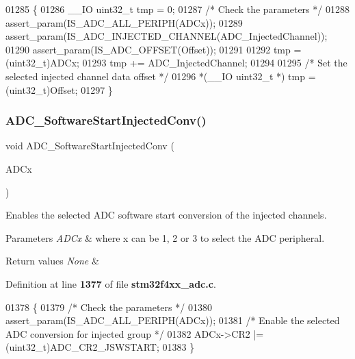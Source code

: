 \begin{DoxyCode}
01285 \{
01286     \_\_IO uint32\_t tmp = 0;
01287   \textcolor{comment}{/* Check the parameters */}
01288   assert_param(IS_ADC_ALL_PERIPH(ADCx));
01289   assert_param(IS_ADC_INJECTED_CHANNEL(ADC\_InjectedChannel));
01290   assert_param(IS_ADC_OFFSET(Offset));
01291   
01292   tmp = (uint32\_t)ADCx;
01293   tmp += ADC\_InjectedChannel;
01294   
01295   \textcolor{comment}{/* Set the selected injected channel data offset */}
01296  *(\_\_IO uint32\_t *) tmp = (uint32\_t)Offset;
01297 \}
\end{DoxyCode}
\mbox{\label{group__ADC__Group6_ga79b2f6c3c77925b35495f2db228895de}} 
\subsubsection{A\+D\+C\+\_\+\+Software\+Start\+Injected\+Conv()}
{\footnotesize\ttfamily void A\+D\+C\+\_\+\+Software\+Start\+Injected\+Conv (\begin{DoxyParamCaption}\item[{\textbf{ A\+D\+C\+\_\+\+Type\+Def} $\ast$}]{A\+D\+Cx }\end{DoxyParamCaption})}



Enables the selected A\+DC software start conversion of the injected channels. 


\begin{DoxyParams}{Parameters}
{\em A\+D\+Cx} & where x can be 1, 2 or 3 to select the A\+DC peripheral. \\
\hline
\end{DoxyParams}

\begin{DoxyRetVals}{Return values}
{\em None} & \\
\hline
\end{DoxyRetVals}


Definition at line \textbf{ 1377} of file \textbf{ stm32f4xx\+\_\+adc.\+c}.


\begin{DoxyCode}
01378 \{
01379   \textcolor{comment}{/* Check the parameters */}
01380   assert_param(IS_ADC_ALL_PERIPH(ADCx));
01381   \textcolor{comment}{/* Enable the selected ADC conversion for injected group */}
01382   ADCx->CR2 |= (uint32\_t)ADC_CR2_JSWSTART;
01383 \}
\end{DoxyCode}
